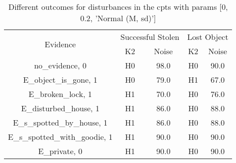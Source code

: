 \begin{table}\begin{tabular}{c|cc|cc}\toprule\multirow{2}{*}{Evidence} & \multicolumn{2}{c}{Successful Stolen} & \multicolumn{2}{c}{Lost Object} \\& {K2} & {Noise} & {K2} & {Noise} \\\midrule
no\_evidence, 0 & H0&98.0&\cellcolor{Bittersweet}H0&\cellcolor{Bittersweet}90.0\\E\_object\_is\_gone, 1 & \cellcolor{Bittersweet}H0&\cellcolor{Bittersweet}79.0&\cellcolor{Bittersweet}H1&\cellcolor{Bittersweet}67.0\\E\_broken\_lock, 1 & \cellcolor{Bittersweet}H1&\cellcolor{Bittersweet}70.0&\cellcolor{Bittersweet}H0&\cellcolor{Bittersweet}76.0\\E\_disturbed\_house, 1 & \cellcolor{Bittersweet}H1&\cellcolor{Bittersweet}86.0&\cellcolor{Bittersweet}H0&\cellcolor{Bittersweet}88.0\\E\_s\_spotted\_by\_house, 1 & \cellcolor{Bittersweet}H1&\cellcolor{Bittersweet}86.0&\cellcolor{Bittersweet}H0&\cellcolor{Bittersweet}88.0\\E\_s\_spotted\_with\_goodie, 1 & \cellcolor{Bittersweet}H1&\cellcolor{Bittersweet}90.0&\cellcolor{Bittersweet}H0&\cellcolor{Bittersweet}90.0\\E\_private, 0 & \cellcolor{Bittersweet}H1&\cellcolor{Bittersweet}90.0&\cellcolor{Bittersweet}H0&\cellcolor{Bittersweet}90.0\\\bottomrule\end{tabular}\caption{Different outcomes for disturbances in the cpts with params [0, 0.2, 'Normal (M, sd)']}\end{table}